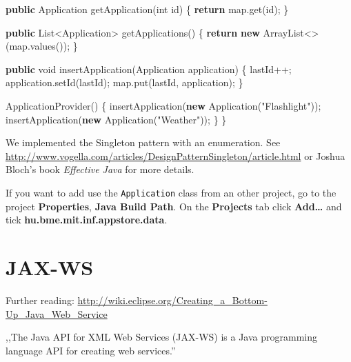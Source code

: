 \documentclass[]{report}
\newenvironment{Shaded}{}{}
\newcommand{\KeywordTok}[1]{\textcolor[rgb]{0.00,0.44,0.13}{\textbf{{#1}}}}
\newcommand{\DataTypeTok}[1]{\textcolor[rgb]{0.56,0.13,0.00}{{#1}}}
\newcommand{\StringTok}[1]{\textcolor[rgb]{0.25,0.44,0.63}{{#1}}}
\newcommand{\FunctionTok}[1]{\textcolor[rgb]{0.02,0.16,0.49}{{#1}}}
\newcommand{\NormalTok}[1]{{#1}}
\begin{document}
\begin{enumerate}
\begin{Shaded}
\begin{Highlighting}[]
  \KeywordTok{public} \NormalTok{Application }\FunctionTok{getApplication}\NormalTok{(}\DataTypeTok{int} \NormalTok{id) \{}
    \KeywordTok{return} \NormalTok{map.}\FunctionTok{get}\NormalTok{(id);     }
  \NormalTok{\}}

  \KeywordTok{public} \NormalTok{List<Application> }\FunctionTok{getApplications}\NormalTok{() \{}
    \KeywordTok{return} \KeywordTok{new} \NormalTok{ArrayList<>(map.}\FunctionTok{values}\NormalTok{());}
  \NormalTok{\}}

  \KeywordTok{public} \DataTypeTok{void} \FunctionTok{insertApplication}\NormalTok{(Application application) \{}
      \NormalTok{lastId++;}
      \NormalTok{application.}\FunctionTok{setId}\NormalTok{(lastId);}
      \NormalTok{map.}\FunctionTok{put}\NormalTok{(lastId, application);}
  \NormalTok{\}}


  \FunctionTok{ApplicationProvider}\NormalTok{() \{}
    \FunctionTok{insertApplication}\NormalTok{(}\KeywordTok{new} \FunctionTok{Application}\NormalTok{(}\StringTok{"Flashlight"}\NormalTok{));}
    \FunctionTok{insertApplication}\NormalTok{(}\KeywordTok{new} \FunctionTok{Application}\NormalTok{(}\StringTok{"Weather"}\NormalTok{));}
  \NormalTok{\}}
\NormalTok{\}}
\end{Highlighting}
\end{Shaded}

  We implemented the Singleton pattern with an enumeration. See
  \url{http://www.vogella.com/articles/DesignPatternSingleton/article.html}
  or Joshua Bloch's book \emph{Effective Java} for more details.
\end{enumerate}

If you want to add use the \texttt{Application} class from an other
project, go to the project \textbf{Properties}, \textbf{Java Build
Path}. On the \textbf{Projects} tab click \textbf{Add\ldots{}} and tick
\textbf{hu.bme.mit.inf.appstore.data}.

\section{JAX-WS}

Further reading:
\url{http://wiki.eclipse.org/Creating_a_Bottom-Up_Java_Web_Service}

,,The Java API for XML Web Services (JAX-WS) is a Java programming
language API for creating web services.''
\end{document}
